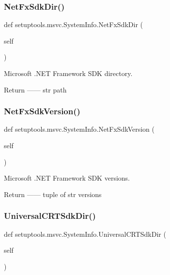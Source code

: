 \subsubsection{\texorpdfstring{Net\+Fx\+Sdk\+Dir()}{NetFxSdkDir()}}
{\footnotesize\ttfamily def setuptools.\+msvc.\+System\+Info.\+Net\+Fx\+Sdk\+Dir (\begin{DoxyParamCaption}\item[{}]{self }\end{DoxyParamCaption})}

\begin{DoxyVerb}Microsoft .NET Framework SDK directory.

Return
------
str
    path
\end{DoxyVerb}
 \mbox{\label{classsetuptools_1_1msvc_1_1SystemInfo_a6d388097caf3354628b82893e620bf6f}} 
\subsubsection{\texorpdfstring{Net\+Fx\+Sdk\+Version()}{NetFxSdkVersion()}}
{\footnotesize\ttfamily def setuptools.\+msvc.\+System\+Info.\+Net\+Fx\+Sdk\+Version (\begin{DoxyParamCaption}\item[{}]{self }\end{DoxyParamCaption})}

\begin{DoxyVerb}Microsoft .NET Framework SDK versions.

Return
------
tuple of str
    versions
\end{DoxyVerb}
 \mbox{\label{classsetuptools_1_1msvc_1_1SystemInfo_afb81ca0402cf16fb2ee7d2a8867ee604}} 
\subsubsection{\texorpdfstring{Universal\+C\+R\+T\+Sdk\+Dir()}{UniversalCRTSdkDir()}}
{\footnotesize\ttfamily def setuptools.\+msvc.\+System\+Info.\+Universal\+C\+R\+T\+Sdk\+Dir (\begin{DoxyParamCaption}\item[{}]{self }\end{DoxyParamCaption})}

